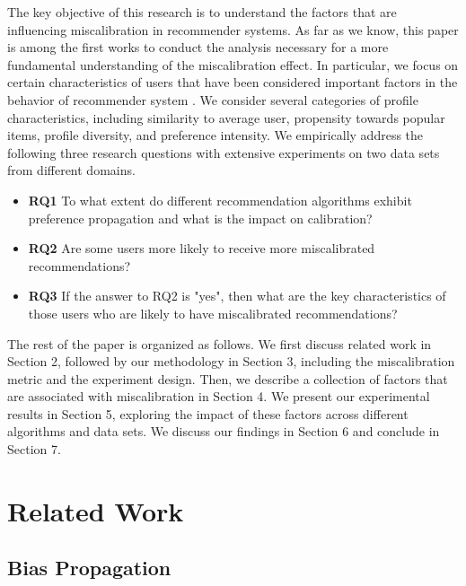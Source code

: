 The key objective of this research is to understand the factors that are influencing miscalibration in recommender systems. As far as we know, this paper is among the first works to conduct the analysis necessary for a more fundamental understanding of the miscalibration effect. In particular, we  focus on certain characteristics of users that have been considered important factors in the behavior of recommender system \cite{yin2012challenging, eskandanian2019power}. We consider several categories of profile characteristics, including similarity to average user, propensity towards popular items, profile diversity, and preference intensity. We empirically address the following three research questions with extensive experiments on two data sets from different domains. 

\begin{itemize}
    \item \textbf{RQ1} To what extent do different recommendation algorithms exhibit preference propagation and what is the impact on calibration?
    \item \textbf{RQ2} Are some users more likely to receive more miscalibrated recommendations? 
    \item \textbf{RQ3} If the answer to RQ2 is "yes", then what are the key characteristics of those users who are likely to have miscalibrated recommendations? 
\end{itemize}

The rest of the paper is organized as follows. We first discuss related work in Section 2, followed by our methodology in Section 3, including the miscalibration metric and the experiment design. Then, we describe a collection of factors that are associated with miscalibration in Section 4. We present our experimental results in Section 5, exploring the impact of these factors across different algorithms and data sets. We discuss our findings in Section 6 and conclude in Section 7. 

\section{Related Work}

\subsection{Bias Propagation}


